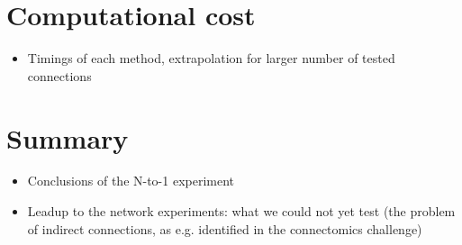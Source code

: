 \FloatBarrier
\section{Computational cost}

\begin{itemize}
    \item Timings of each method, extrapolation for larger number of tested connections
\end{itemize}

\section{Summary}

\begin{itemize}
    \item Conclusions of the N-to-1 experiment
    \item Leadup to the network experiments: what we could not yet test (the problem of indirect connections, as e.g. identified in the connectomics challenge)
\end{itemize}
